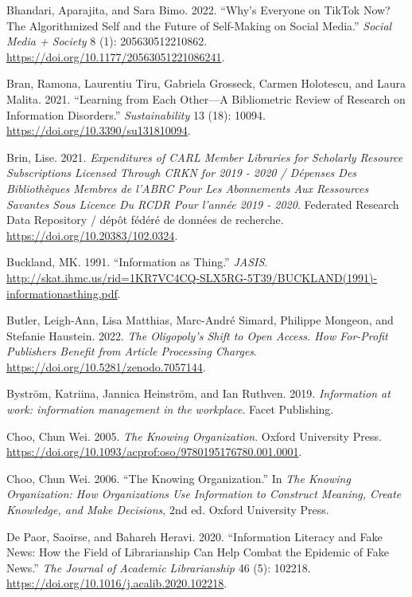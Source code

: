 \documentclass[
  letterpaper,
  DIV=11,
  numbers=noendperiod]{scrreprt}
\newlength{\cslhangindent}
\newenvironment{CSLReferences}[2] %
 {\begin{list}{}{%
  \setlength{\itemindent}{0pt}
  \setlength{\leftmargin}{0pt}
  \setlength{\parsep}{0pt}
  \ifodd #1
   \setlength{\leftmargin}{\cslhangindent}
   \setlength{\itemindent}{-1\cslhangindent}
  \fi
  \setlength{\itemsep}{#2\baselineskip}}}
 {\end{list}}
\begin{document}
\begin{CSLReferences}{1}{1}
Bhandari, Aparajita, and Sara Bimo. 2022. {``Why{'}s Everyone on TikTok
Now? The Algorithmized Self and the Future of Self-Making on Social
Media.''} \emph{Social Media + Society} 8 (1): 205630512210862.
\url{https://doi.org/10.1177/20563051221086241}.

Bran, Ramona, Laurentiu Tiru, Gabriela Grosseck, Carmen Holotescu, and
Laura Malita. 2021. {``Learning from {Each} {Other}---{A} {Bibliometric}
{Review} of {Research} on {Information} {Disorders}.''}
\emph{Sustainability} 13 (18): 10094.
\url{https://doi.org/10.3390/su131810094}.

Brin, Lise. 2021. \emph{Expenditures of CARL Member Libraries for
Scholarly Resource Subscriptions Licensed Through CRKN for 2019 - 2020 /
Dépenses Des Bibliothèques Membres de l'ABRC Pour Les Abonnements Aux
Ressources Savantes Sous Licence Du RCDR Pour l'année 2019 - 2020}.
Federated Research Data Repository / dépôt fédéré de données de
recherche. \url{https://doi.org/10.20383/102.0324}.

Buckland, MK. 1991. {``Information as Thing.''} \emph{JASIS}.
\url{http://skat.ihmc.us/rid=1KR7VC4CQ-SLX5RG-5T39/BUCKLAND(1991)-informationasthing.pdf}.

Butler, Leigh-Ann, Lisa Matthias, Marc-André Simard, Philippe Mongeon,
and Stefanie Haustein. 2022. \emph{The Oligopoly's Shift to Open Access.
How For-Profit Publishers Benefit from Article Processing Charges}.
\url{https://doi.org/10.5281/zenodo.7057144}.

Byström, Katriina, Jannica Heinström, and Ian Ruthven. 2019.
\emph{Information at work: information management in the workplace}.
Facet Publishing.

Choo, Chun Wei. 2005. \emph{The Knowing Organization}. Oxford University
Press. \url{https://doi.org/10.1093/acprof:oso/9780195176780.001.0001}.

Choo, Chun Wei. 2006. {``The Knowing Organization.''} In \emph{The
Knowing Organization: How Organizations Use Information to Construct
Meaning, Create Knowledge, and Make Decisions}, 2nd ed. Oxford
University Press.

De Paor, Saoirse, and Bahareh Heravi. 2020. {``Information Literacy and
Fake News: How the Field of Librarianship Can Help Combat the Epidemic
of Fake News.''} \emph{The Journal of Academic Librarianship} 46 (5):
102218. \url{https://doi.org/10.1016/j.acalib.2020.102218}.


\end{CSLReferences}
\end{document}

